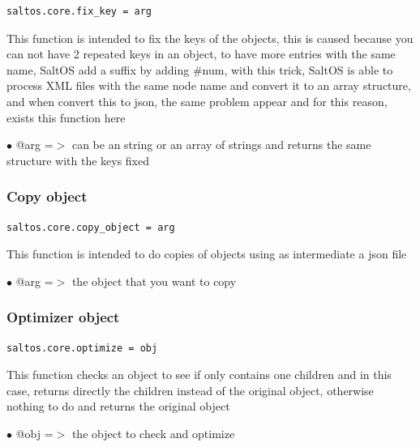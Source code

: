 \documentclass[a4paper]{article}
\begin{document}
\begin{lstlisting}
saltos.core.fix_key = arg
\end{lstlisting}

This function is intended to fix the keys of the objects, this is caused because you can not
have 2 repeated keys in an object, to have more entries with the same name, SaltOS add a suffix
by adding \#num, with this trick, SaltOS is able to process XML files with the same node name
and convert it to an array structure, and when convert this to json, the same problem appear and
for this reason, exists this function here

\begin{compactitem}
\item[\color{myblue}$\bullet$] @arg =$>$ can be an string or an array of strings and returns the same structure with the keys fixed
\end{compactitem}

\hypertarget{toc147}{}
\subsubsection{Copy object}

\begin{lstlisting}
saltos.core.copy_object = arg
\end{lstlisting}

This function is intended to do copies of objects using as intermediate a json file

\begin{compactitem}
\item[\color{myblue}$\bullet$] @arg =$>$ the object that you want to copy
\end{compactitem}

\hypertarget{toc148}{}
\subsubsection{Optimizer object}

\begin{lstlisting}
saltos.core.optimize = obj
\end{lstlisting}

This function checks an object to see if only contains one children and in this case, returns
directly the children instead of the original object, otherwise nothing to do and returns the
original object

\begin{compactitem}
\item[\color{myblue}$\bullet$] @obj =$>$ the object to check and optimize
\end{compactitem}
\end{document}
